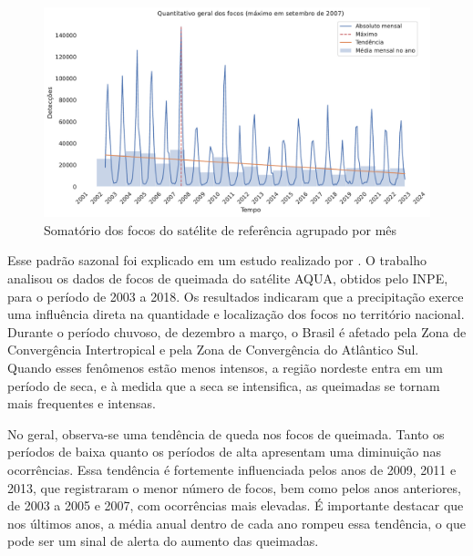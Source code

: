 \documentclass[cic,tc]{iiufrgs}
\begin{document}
\begin{figure}[!htb]
    \caption{Somatório dos focos do satélite de referência agrupado por mês}
    \begin{center}
        \includegraphics[width=35em]{quantitativo_geral}
    \end{center}
    \label{fig:quantitativo_geral}
\end{figure}

Esse padrão sazonal foi explicado em um estudo realizado por \citet{martins2020dinamica}. O trabalho analisou os dados de focos de queimada do satélite AQUA, obtidos pelo INPE, para o período de 2003 a 2018. Os resultados indicaram que a precipitação exerce uma influência direta na quantidade e localização dos focos no território nacional. Durante o período chuvoso, de dezembro a março, o Brasil é afetado pela Zona de Convergência Intertropical e pela Zona de Convergência do Atlântico Sul. Quando esses fenômenos estão menos intensos, a região nordeste entra em um período de seca, e à medida que a seca se intensifica, as queimadas se tornam mais frequentes e intensas.

No geral, observa-se uma tendência de queda nos focos de queimada. Tanto os períodos de baixa quanto os períodos de alta apresentam uma diminuição nas ocorrências. Essa tendência é fortemente influenciada pelos anos de 2009, 2011 e 2013, que registraram o menor número de focos, bem como pelos anos anteriores, de 2003 a 2005 e 2007, com ocorrências mais elevadas. É importante destacar que nos últimos anos, a média anual dentro de cada ano rompeu essa tendência, o que pode ser um sinal de alerta do aumento das queimadas.
\end{document}
